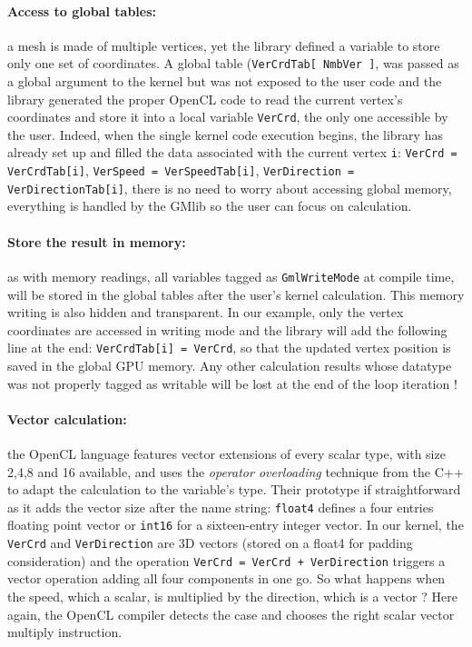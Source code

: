 \documentclass[a4paper,12pt]{article}
\begin{document}
\paragraph{Access to global tables:} a mesh is made of multiple vertices, yet the library defined a variable to store only one set of coordinates. A global table ({\tt VerCrdTab[ NmbVer ]}, was passed as a global argument to the kernel but was not exposed to the user code and the library generated the proper OpenCL code to read the current vertex's coordinates and store it into a local variable {\tt VerCrd}, the only one accessible by the user. Indeed, when the single kernel code execution begins, the library has already set up and filled the data associated with the current vertex {\tt i}: {\tt VerCrd = VerCrdTab[i]}, {\tt VerSpeed = VerSpeedTab[i]}, {\tt VerDirection = VerDirectionTab[i]}, there is no need to worry about accessing global memory, everything is handled by the GMlib so the user can focus on calculation.

\paragraph{Store the result in memory:} as with memory readings, all variables tagged as {\tt GmlWriteMode} at compile time, will be stored in the global tables after the user's kernel calculation. This memory writing is also hidden and transparent. In our example, only the vertex coordinates are accessed in writing mode and the library will add the following line at the end: {\tt VerCrdTab[i] = VerCrd}, so that the updated vertex position is saved in the global GPU memory. Any other calculation results whose datatype was not properly tagged as writable will be lost at the end of the loop iteration !

\paragraph{Vector calculation:} the OpenCL language features vector extensions of every scalar type, with size 2,4,8 and 16 available, and uses the \emph{operator overloading} technique from the C++ to adapt the calculation to the variable's type. Their prototype if straightforward as it adds the vector size after the name string: {\tt float4} defines a four entries floating point vector or {\tt int16} for a sixteen-entry integer vector. In our kernel, the {\tt VerCrd} and {\tt VerDirection} are 3D vectors (stored on a float4 for padding consideration) and the operation {\tt VerCrd = VerCrd + VerDirection} triggers a vector operation adding all four components in one go. So what happens when the speed, which a scalar, is multiplied by the direction, which is a vector ? Here again, the OpenCL compiler detects the case and chooses the right scalar vector multiply instruction.
\end{document}
